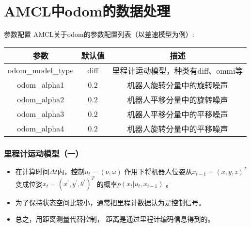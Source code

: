 \section{AMCL中odom的数据处理}



\begin{frame}{参数配置}
  AMCL关于odom的参数配置列表（以差速模型为例）:

  \begin{table}[htbp!]
    \centering
    \begin{tabular}{c|c|c}
      \toprule[1pt]
      参数	& 默认值 & 描述  \\
      \toprule[1pt]
      odom\_model\_type	& diff & 里程计运动模型，种类有diff、ommi等 \\
 	    \hline
      odom\_alpha1	&  0.2 & 机器人旋转分量中的旋转噪声 \\
      \hline
      odom\_alpha2	&  0.2 & 机器人平移分量中的旋转噪声 \\
      \hline
      odom\_alpha3	&  0.2 & 机器人平移分量中的平移噪声 \\
      \hline
      odom\_alpha4	&  0.2 & 机器人旋转分量中的平移噪声 \\
 	    \bottomrule[1pt]
    \end{tabular}
  \end{table}
\end{frame}

\begin{frame}
  \frametitle{里程计运动模型（一）}
  \begin{itemize}
    \item 在计算时间$\Delta t$内，控制$u_t = (\nu, \omega)$ 作用下将机器人位姿从$x_{t-1} = (x, y, z)^T$ 
          变成位姿$x_t = (x^\prime, y^\prime, \theta^\prime)^T$ 的概率$p(x_t | u_t, x_{t-1})$ 。
    \item 为了保持状态空间比较小，通常把里程计数据认为是控制信号。
    \item 总之，用距离测量代替控制， 距离是通过里程计编码信息得到的。
  \end{itemize}

\end{frame}




